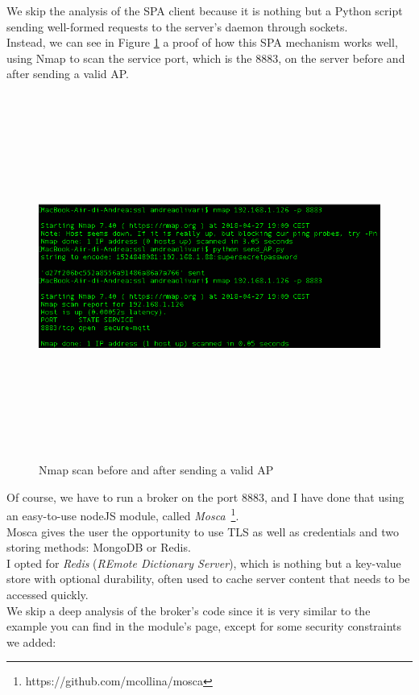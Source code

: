 \documentclass[12pt]{report}
\begin{document}
{We skip the analysis of the SPA client because it is nothing but a Python script sending well-formed requests to the server's daemon through sockets.\\

Instead, we can see in Figure \ref{fig:nmapproof} a proof of how this SPA mechanism works well, using Nmap to scan the service port, which is the 8883, on the server before and after sending a valid AP.

\begin{figure}[H]
\includegraphics[width=13cm,height=12cm,keepaspectratio]{nmap_proof}
\centering
\caption{Nmap scan before and after sending a valid AP}
\label{fig:nmapproof}
\end{figure}

Of course, we have to run a broker on the port 8883, and I have done that using an easy-to-use nodeJS module, called \emph{Mosca}~\footnote{https://github.com/mcollina/mosca}.\\ 

Mosca gives the user the opportunity to use TLS as well as credentials and two storing methods: MongoDB or Redis.\\
I opted for \emph{Redis} (\emph{REmote Dictionary Server}), which is  nothing but a key-value store with optional durability, often used to cache server content that needs to be accessed quickly.\\
We skip a deep analysis of the broker's code since it is very similar to the example you can find in the module's page, except for some security constraints we added:

}
\end{document}
